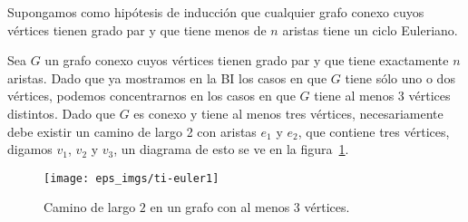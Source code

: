 \begin{teorema}
\begin{demostracion}
\begin{inducciondemo}
  \HI Supongamos como hipótesis de inducción que cualquier grafo conexo cuyos vértices tienen grado par y que tiene menos de $n$ aristas tiene un ciclo Euleriano.
  
  \TI Sea $G$ un grafo conexo cuyos vértices tienen grado par y que tiene exactamente $n$ aristas. 
  Dado que ya mostramos en la BI los casos en que $G$ tiene sólo uno o dos vértices, podemos concentrarnos en los casos en que $G$ tiene al menos $3$ vértices distintos.
  Dado que $G$ es conexo y tiene al menos tres vértices, necesariamente debe existir un camino de largo 2 con aristas $e_1$ y $e_2$, que contiene tres vértices, digamos $v_1$, $v_2$ y $v_3$, un diagrama de esto se ve en la figura~\ref{fig:ti-euler1}.
  
  \begin{figure}[h!]
  \centering
  \texttt{[image: eps\_imgs/ti-euler1]}
  \caption{Camino de largo $2$ en un grafo con al menos $3$ vértices.}
  \label{fig:ti-euler1}
  \end{figure}
  

\end{inducciondemo}
\end{demostracion}
\end{teorema}
